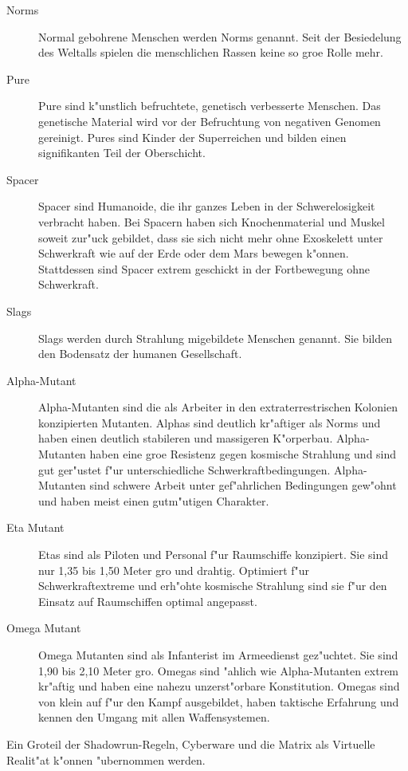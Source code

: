 \begin{description}
\item [Norms] Normal gebohrene Menschen werden Norms genannt. Seit der Besiedelung des Weltalls spielen die
      menschlichen Rassen keine so gro\3e Rolle mehr.
\item [Pure] Pure sind k"unstlich befruchtete, genetisch verbesserte Menschen. Das genetische Material wird vor der
      Befruchtung von negativen Genomen gereinigt. Pures sind Kinder der Superreichen und bilden einen signifikanten Teil der Oberschicht.
\item [Spacer] Spacer sind Humanoide, die ihr ganzes Leben in der Schwerelosigkeit verbracht haben. Bei Spacern haben
      sich Knochenmaterial und Muskel soweit zur"uck gebildet, dass sie sich nicht mehr ohne Exoskelett unter Schwerkraft wie auf der Erde oder dem Mars bewegen k"onnen. Stattdessen sind Spacer extrem geschickt in der Fortbewegung ohne Schwerkraft.
\item [Slags] Slags werden durch Strahlung mi\3gebildete Menschen genannt. Sie bilden den Bodensatz der
      humanen Gesellschaft.
\item [Alpha-Mutant] Alpha-Mutanten sind die als Arbeiter in den extraterrestrischen Kolonien konzipierten Mutanten.
      Alphas sind deutlich kr"aftiger als Norms und haben einen deutlich stabileren und massigeren K"orperbau. Alpha-Mutanten haben eine gro\3e Resistenz gegen kosmische Strahlung und sind gut ger"ustet f"ur unterschiedliche Schwerkraftbedingungen. Alpha-Mutanten sind schwere Arbeit unter gef"ahrlichen Bedingungen gew"ohnt und haben meist einen gutm"utigen Charakter.
\item [Eta Mutant] Etas sind als Piloten und Personal f"ur Raumschiffe konzipiert. Sie sind nur 1,35 bis 1,50 Meter gro\3
      und drahtig. Optimiert f"ur Schwerkraftextreme und erh"ohte kosmische Strahlung sind sie f"ur den Einsatz auf Raumschiffen optimal angepasst.
\item [Omega Mutant] Omega Mutanten sind als Infanterist im Armeedienst gez"uchtet. Sie sind 1,90 bis 2,10 Meter gro\3.
      Omegas sind "ahlich wie Alpha-Mutanten extrem kr"aftig und haben eine nahezu unzerst"orbare Konstitution. Omegas sind von klein auf f"ur den Kampf ausgebildet, haben taktische Erfahrung und kennen den Umgang mit allen Waffensystemen.
\end{description}


Ein Gro\3teil der Shadowrun-Regeln, Cyberware und die Matrix als Virtuelle Realit"at k"onnen "ubernommen werden.


